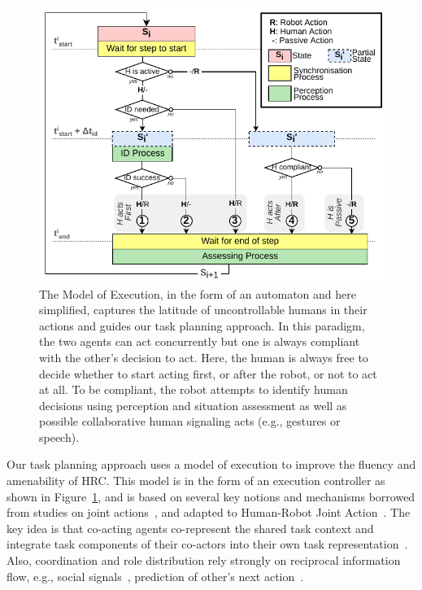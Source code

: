 \begin{figure}
    \centering
    \includegraphics[width=\linewidth]{images/Chapter4/Execution_Automaton.drawio.pdf}
    \caption{
    The Model of Execution, in the form of an automaton and here simplified, captures the latitude of uncontrollable humans in their actions and guides our task planning approach.
    In this paradigm, the two agents can act concurrently but one is always compliant with the other's decision to act.
    Here, the human is always free to decide whether to start acting first, or after the robot, or not to act at all.
    To be compliant, the robot attempts to identify human decisions using perception and situation assessment as well as possible collaborative human signaling acts (e.g., gestures or speech).
    }
    \label{fig:model_of_execution}
\end{figure}

Our task planning approach uses a model of execution to improve the fluency and amenability of HRC. 
This model is in the form of an execution controller as shown in Figure~\ref{fig:model_of_execution}, and is based on several key notions and mechanisms borrowed from studies on joint actions~\cite{Sebanz-2016,kourtis2014attention}, and adapted to Human-Robot Joint Action~\cite{clodic-2017,curioni-2019}.
The key idea is that co-acting agents co-represent the shared task context and integrate task components of their co-actors into their own task representation~\cite{Schmitz-2017, Yamaguchi-19}. Also, coordination and role distribution rely strongly on reciprocal information flow, e.g., social signals~\cite{curioni-2019}, prediction of other's next action~\cite{luke-2018}.

